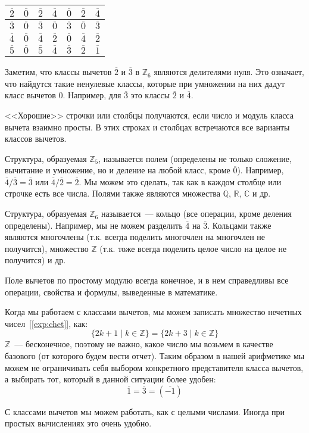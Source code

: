 \documentclass[russian]{lecture-notes}
\newcommand{\klas}[1]{\overline{#1}}
\begin{document}
\begin{example}
\begin{table}[H]
\begin{subtable}[H]{0.49\linewidth}
\begin{tabular}{|c|c|c|c|c|c|c|}
				$\klas{2}$ & $\klas{0}$ & $\klas{2}$ & $\klas{4}$ & $\klas{0}$ & $\klas{2}$ & $\klas{4}$\\ \hline
				
				$\klas{3}$ & $\klas{0}$ & $\klas{3}$ & $\klas{0}$ & $\klas{3}$ & $\klas{0}$ & $\klas{3}$\\ \hline
				
				$\klas{4}$ & $\klas{0}$ & $\klas{4}$ & $\klas{2}$ & $\klas{0}$ & $\klas{4}$ & $\klas{2}$\\ \hline
				
				$\klas{5}$ & $\klas{0}$ & $\klas{5}$ & $\klas{4}$ & $\klas{3}$ & $\klas{2}$ & $\klas{1}$\\ \hline
			\end{tabular}
		\end{subtable}
	\end{table}
\end{example}

\begin{note}
	Заметим, что классы вычетов $\klas{2}$ и $\klas{3}$ в $\mathbb{Z}_6$ являются делителями нуля. Это означает, что найдутся такие ненулевые классы, которые при умножении на них дадут класс вычетов 0.  Например, для $\klas{3}$  это классы $\klas{2}$  и $\klas{4}$.
	
	<<Хорошие>> строчки или столбцы получаются, если число и модуль класса вычета взаимно просты. В этих строках и столбцах встречаются все варианты классов вычетов.
	
	Структура, образуемая $\mathbb{Z}_5$, называется полем (определены не только сложение, вычитание и умножение, но и деление на любой класс, кроме $\klas{0}$). Например, $\klas{4} / \klas{3} = \klas{3}$ или $\klas{4} / \klas{2} = \klas{2}$. Мы можем это сделать, так как в каждом столбце или строчке есть все числа. Полями также являются множества $\mathbb{Q}$, $\mathbb{R}$, $\mathbb{C}$ и др.

	Структура, образуемая $\mathbb{Z}_6$ называется~--- кольцо (все операции, кроме деления определены). Например, мы не можем разделить $\klas{4}$ на $\klas{3}$. Кольцами также являются многочлены (т.к. всегда поделить многочлен на многочлен не получится), множество $\mathbb{Z}$ (т.к. тоже всегда поделить целое число на целое не получится) и др.
	
	Поле вычетов по простому модулю всегда конечное, и в нем справедливы все операции, свойства и формулы, выведенные в математике.
	
	Когда мы работаем с классами вычетов, мы можем записать множество нечетных чисел~[\ref{exp:chet}], как:
	\[
		\{ 2k+1 \mid k \in \mathbb{Z}\} = \{ 2k+3 \mid k \in \mathbb{Z}\}
	\]
	$\mathbb{Z}$~--- бесконечное, поэтому не важно, какое число мы возьмем в качестве базового (от которого будем вести отчет). Таким образом в нашей арифметике мы можем не ограничивать себя выбором конкретного представителя класса вычетов, а выбирать тот, который в данной ситуации более удобен:
	\[
		\klas{1} = \klas{3} = (\klas{-1})
	\]
	
	С классами вычетов мы можем работать, как с целыми числами. Иногда при простых вычислениях это очень удобно.
\end{note}
\end{document}
